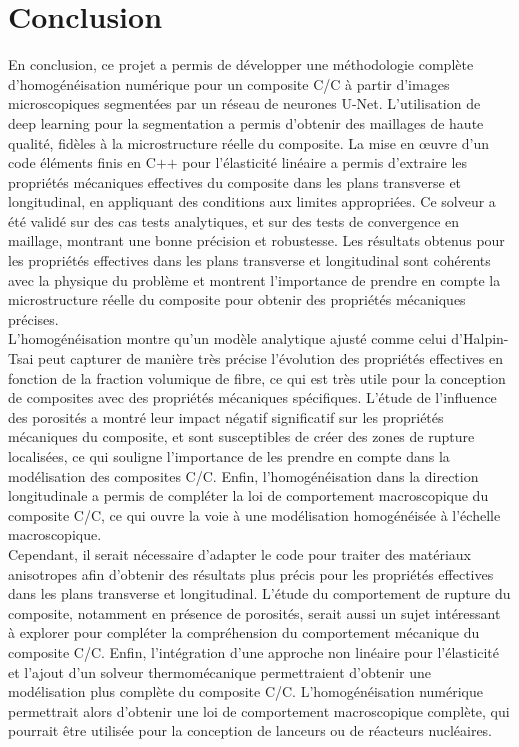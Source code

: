 \documentclass[a4paper,11pt]{article}
\begin{document}
\newpage
\section*{Conclusion}

En conclusion, ce projet a permis de développer une méthodologie complète d'homogénéisation numérique pour un composite C/C à partir d'images microscopiques segmentées par un réseau de neurones U-Net. L'utilisation de deep learning pour la segmentation a permis d'obtenir des maillages de haute qualité, fidèles à la microstructure réelle du composite. La mise en œuvre d'un code éléments finis en C$\texttt{++}$ pour l'élasticité linéaire a permis d'extraire les propriétés mécaniques effectives du composite dans les plans transverse et longitudinal, en appliquant des conditions aux limites appropriées. Ce solveur a été validé sur des cas tests analytiques, et sur des tests de convergence en maillage, montrant une bonne précision et robustesse. Les résultats obtenus pour les propriétés effectives dans les plans transverse et longitudinal sont cohérents avec la physique du problème et montrent l'importance de prendre en compte la microstructure réelle du composite pour obtenir des propriétés mécaniques précises. \\

L'homogénéisation montre qu'un modèle analytique ajusté comme celui d'Halpin-Tsai peut capturer de manière très précise l'évolution des propriétés effectives en fonction de la fraction volumique de fibre, ce qui est très utile pour la conception de composites avec des propriétés mécaniques spécifiques. L'étude de l'influence des porosités a montré leur impact négatif significatif sur les propriétés mécaniques du composite, et sont susceptibles de créer des zones de rupture localisées, ce qui souligne l'importance de les prendre en compte dans la modélisation des composites C/C. Enfin, l'homogénéisation dans la direction longitudinale a permis de compléter la loi de comportement macroscopique du composite C/C, ce qui ouvre la voie à une modélisation homogénéisée à l'échelle macroscopique. \\

Cependant, il serait nécessaire d'adapter le code pour traiter des matériaux anisotropes afin d'obtenir des résultats plus précis pour les propriétés effectives dans les plans transverse et longitudinal. L'étude du comportement de rupture du composite, notamment en présence de porosités, serait aussi un sujet intéressant à explorer pour compléter la compréhension du comportement mécanique du composite C/C. Enfin, l'intégration d'une approche non linéaire pour l'élasticité et l'ajout d'un solveur thermomécanique permettraient d'obtenir une modélisation plus complète du composite C/C. L'homogénéisation numérique permettrait alors d'obtenir une loi de comportement macroscopique complète, qui pourrait être utilisée pour la conception de lanceurs ou de réacteurs nucléaires.
\end{document}
